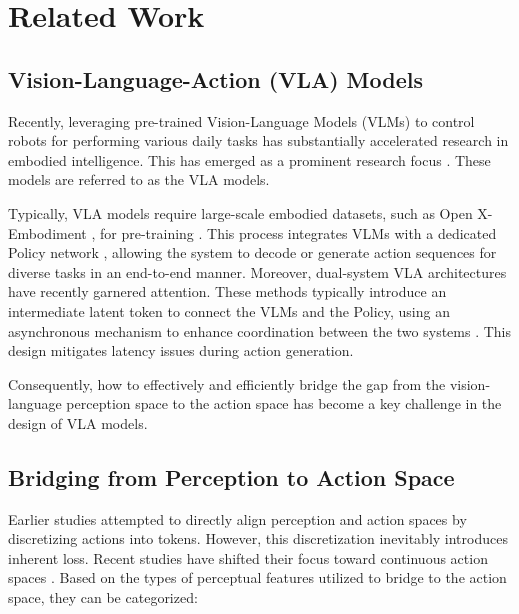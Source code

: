 \section{Related Work}\label{Section_related_work}

\subsection{Vision-Language-Action (VLA) Models} \label{Subsection_VLA}
Recently, leveraging pre-trained Vision-Language Models (VLMs) \citep{Prismatic-2024, PaliGemma-2024, LLaVA-2023, Eagle-2-2025} to control robots for performing various daily tasks has substantially accelerated research in embodied intelligence. This has emerged as a prominent research focus \citep{pi0-2025, pi0.5-2025, SmolVLA-2025, GR00T-N1-2025, RDT-2025, Being-H0-2025, GR3-2025, G0-2025, QUAR-2024, CLOVER-2024, LongVLA-2025, QUARTOnline-2025}. These models are referred to as the VLA models.

Typically, VLA models require large-scale embodied datasets, such as Open X-Embodiment \citep{OpenX-2024}, for pre-training \citep{RDT-2025, GR3-2025}. This process integrates VLMs with a dedicated Policy network \citep{Hume-2025, RoboFlamingo-2024}, allowing the system to decode or generate action sequences for diverse tasks in an end-to-end manner. Moreover, dual-system VLA architectures \citep{LCB-2024, RoboDual-2024, OpenHelix-2025} have recently garnered attention. These methods typically introduce an intermediate latent token to connect the VLMs and the Policy, using an asynchronous mechanism to enhance coordination between the two systems \citep{HiRT-2024}. This design mitigates latency issues during action generation.

Consequently, how to effectively and efficiently bridge the gap from the vision-language perception space to the action space has become a key challenge in the design of VLA models.


\subsection{Bridging from Perception to Action Space} \label{sec22} 
Earlier studies \citep{OpenVLA-2024, RT-2-2023, RT-1-2023} attempted to directly align perception and action spaces by discretizing actions into tokens. However, this discretization inevitably introduces inherent loss. Recent studies have shifted their focus toward continuous action spaces \citep{RoboVLMs-2024, GR00T-N1-2025, pi0-2025, SmolVLA-2025, OpenVLA-OFT-2025}. Based on the types of perceptual features utilized to bridge to the action space, they can be categorized:

